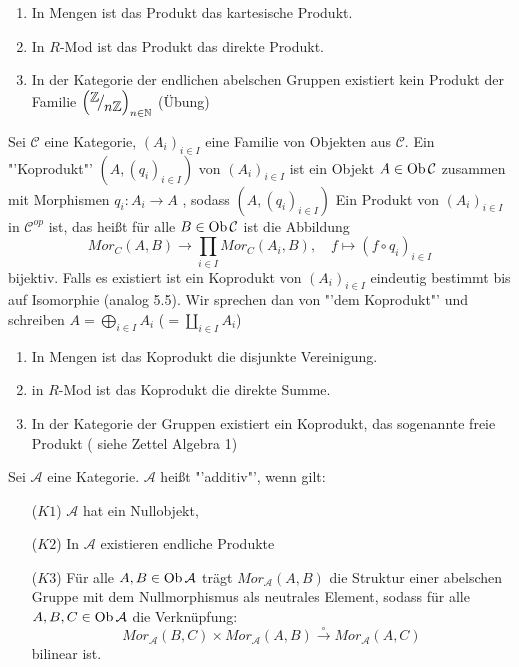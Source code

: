 \begin{bsp}
	\begin{enumerate} [label=\alph*)]
		\item In Mengen ist das Produkt das kartesische Produkt.
		\item In $R$-Mod ist das Produkt das direkte Produkt.
		\item In der Kategorie der endlichen abelschen Gruppen existiert kein Produkt der Familie $\left( \QR{\Z}{n\Z}\right)_{n \in \N}$ (Übung)
	\end{enumerate}
\end{bsp}
\begin{bem+df}
	Sei $\mathcal{C} $ eine Kategorie, $ (A_i)_{i \in I}$ eine Familie von Objekten  aus $ \mathcal{C}$. Ein "'Koprodukt"' $(A, (q_i)_{i \in I})$ von $(A_i)_{i \in I}$ ist ein Objekt $ A \in \text{Ob}\,\mathcal{C} $ zusammen mit Morphismen $ q_i: A_i \to A$ , sodass $(A, (q_i)_{i \in I})$ Ein Produkt von $(A_i)_{i \in I } $ in $ \mathcal{C}^{op} $ ist, das heißt für alle $ B \in \text{Ob}\,\mathcal{C} $ ist die Abbildung $$ Mor_C(A,B) \to \prod_{i \in I} Mor_C(A_i,B) , \quad f \mapsto (f \circ q_i) _{i \in I} $$ bijektiv. Falls es existiert ist ein Koprodukt von $(A_i)_{i \in I }$ eindeutig bestimmt bis auf Isomorphie (analog 5.5). Wir sprechen dan von "'dem Koprodukt"' und schreiben $ A = \bigoplus_{i \in I} A_i $ ($=\coprod_{i\in I} A_i$)
\end{bem+df}
\begin{bsp}
	\begin{enumerate} [label=\alph*)]
		\item In Mengen ist das Koprodukt die disjunkte Vereinigung.
		\item in $R$-Mod ist das Koprodukt die direkte Summe.
		\item In der Kategorie der Gruppen existiert ein Koprodukt, das sogenannte freie Produkt ( siehe Zettel Algebra 1)
	\end{enumerate}
\end{bsp}
\begin{df}
	Sei $\mathcal{A} $ eine Kategorie. $\mathcal{A} $ heißt "'additiv"', wenn gilt:
	\begin{enumerate}
		\item[($K1$)] $\mathcal{A}$ hat ein Nullobjekt,
		\item[($K2$)] In $\mathcal{A}$ existieren endliche Produkte
		\item[($K3$)] Für alle $A,B \in \text{Ob}\,\mathcal{A}$ trägt $Mor_{\mathcal{A}}(A,B) $ die Struktur einer abelschen Gruppe mit dem Nullmorphismus als neutrales Element, sodass für alle $ A,B,C \in \text{Ob}\,\mathcal{A} $ die Verknüpfung:
		 $$ Mor_{\mathcal{A}}(B,C) \times  Mor_{\mathcal{A}}(A,B) \overset{\circ}{\longrightarrow}Mor_{\mathcal{A}}(A,C)$$ bilinear ist.
	\end{enumerate}
\end{df}
